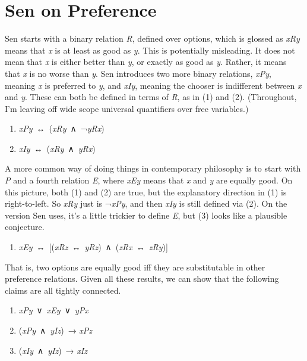 \documentclass[
  11pt,
  letterpaper,
  DIV=11,
  numbers=noendperiod,
  twoside]{scrartcl}
\providecommand{\tightlist}{%
  \setlength{\itemsep}{0pt}\setlength{\parskip}{0pt}}
\begin{document}
\section{Sen on Preference}\label{sec-sen}

Sen starts with a binary relation \emph{R}, defined over options, which
is glossed as \emph{xRy} means that \emph{x} is at least as good as
\emph{y}. This is potentially misleading. It does not mean that \emph{x}
is either better than \emph{y}, or exactly as good as \emph{y}. Rather,
it means that \emph{x} is no worse than \emph{y}. Sen introduces two
more binary relations, \emph{xPy}, meaning \emph{x} is preferred to
\emph{y}, and \emph{xIy}, meaning the chooser is indifferent between
\emph{x} and \emph{y}. These can both be defined in terms of \emph{R},
as in (1) and (2). (Throughout, I'm leaving off wide scope universal
quantifiers over free variables.)

\begin{enumerate}
\def\labelenumi{(\arabic{enumi})}
\tightlist
\item
  \emph{xPy}~↔︎~(\emph{xRy}~∧~¬\emph{yRx})
\item
  \emph{xIy}~↔︎~(\emph{xRy}~∧~\emph{yRx})
\end{enumerate}

A more common way of doing things in contemporary philosophy is to start
with \emph{P} and a fourth relation \emph{E}, where \emph{xEy} means
that \emph{x} and \emph{y} are equally good. On this picture, both (1)
and (2) are true, but the explanatory direction in (1) is right-to-left.
So \emph{xRy} just is ¬\emph{xPy}, and then \emph{xIy} is still defined
via (2). On the version Sen uses, it's a little trickier to define
\emph{E}, but (3) looks like a plausible conjecture.

\begin{enumerate}
\def\labelenumi{(\arabic{enumi})}
\setcounter{enumi}{2}
\tightlist
\item
  \emph{xEy}~↔︎~{[}(\emph{xRz}~↔︎~\emph{yRz})~∧~(\emph{zRx}~↔︎~\emph{zRy}){]}
\end{enumerate}

That is, two options are equally good iff they are substitutable in
other preference relations. Given all these results, we can show that
the following claims are all tightly connected.

\begin{enumerate}
\def\labelenumi{(\arabic{enumi})}
\setcounter{enumi}{3}
\tightlist
\item
  \emph{xPy}~∨~\emph{xEy}~∨~\emph{yPx}
\item
  (\emph{xPy}~∧~\emph{yIz})~→ \emph{xPz}
\item
  (\emph{xIy}~∧~\emph{yIz})~→ \emph{xIz}
\end{enumerate}
\end{document}
